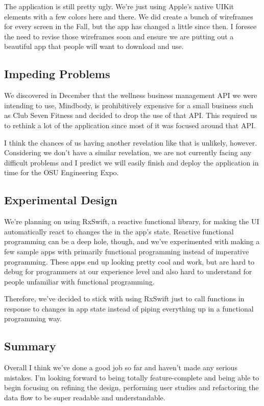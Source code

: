 \documentclass[a4paper]{article}
\begin{document}
The application is still pretty ugly. We’re just using Apple’s native UIKit elements with a few colors here and there. We did create a bunch of wireframes for every screen in the Fall, but the app has changed a little since then. I foresee the need to revise those wireframes soon and ensure we are putting out a beautiful app that people will want to download and use.

\subsection{Impeding Problems}
We discovered in December that the wellness business management API we were intending to use, Mindbody, is prohibitively expensive for a small business such as Club Seven Fitness and decided to drop the use of that API. This required us to rethink a lot of the application since most of it was focused around that API.

I think the chances of us having another revelation like that is unlikely, however. Considering we don’t have a similar revelation, we are not currently facing any difficult problems and I predict we will easily finish and deploy the application in time for the OSU Engineering Expo.

\subsection{Experimental Design}
We’re planning on using RxSwift, a reactive functional library, for making the UI automatically react to changes the in the app’s state. Reactive functional programming can be a deep hole, though, and we’ve experimented with making a few sample apps with primarily functional programming instead of imperative programming. These apps end up looking pretty cool and work, but are hard to debug for programmers at our experience level and also hard to understand for people unfamiliar with functional programming.

Therefore, we’ve decided to stick with using RxSwift just to call functions in response to changes in app state instead of piping everything up in a functional programming way.

\subsection{Summary}
Overall I think we've done a good job so far and haven't made any serious mistakes. I'm looking forward to being totally feature-complete and being able to begin focusing on refining the design, performing user studies and refactoring the data flow to be super readable and understandable.
\end{document}
